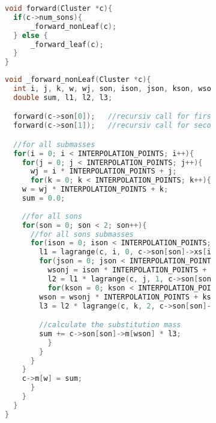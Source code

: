 \begin{figure}[t]
  \begin{subfigure}{0.9\textwidth}
    \begin{lstlisting}[language=C, label=lst:forw, caption={Diese Methode dient dem rekursiven Aufruf der Vorwärtstransformation und delegiert die Konstruktion der Ersatzmassen.
							    Dabei wird zwischen Blatt-und Nicht-Blattclustern unterschieden.}]
void forward(Cluster *c){
  if(c->num_sons){
      _forward_nonLeaf(c);
  } else {
      _forward_leaf(c);
  }
}
    \end{lstlisting}
  \end{subfigure}
\end{figure}

\begin{figure}[p]
  \begin{subfigure}{0.9\textwidth}
    \begin{lstlisting}[language=C, label=lst:forwnonleaf, caption={Diese Methode arbeitet auf den Transfermatrizen und ruft daher zuert rekursiv die Vorwärtstransformation für die Sohncluster auf.}]
void _forward_nonLeaf(Cluster *c){
  int i, j, k, w, wj, son, ison, json, kson, wson, wsonj;
  double sum, l1, l2, l3;

  forward(c->son[0]);	//recursiv call for first son
  forward(c->son[1]);	//recursiv call for second son

  //for all submasses
  for(i = 0; i < INTERPOLATION_POINTS; i++){
    for(j = 0; j < INTERPOLATION_POINTS; j++){
      wj = i * INTERPOLATION_POINTS + j;
      for(k = 0; k < INTERPOLATION_POINTS; k++){
	w = wj * INTERPOLATION_POINTS + k;
	sum = 0.0;
	
	//for all sons
	for(son = 0; son < 2; son++){
	  //for all sons submasses
	  for(ison = 0; ison < INTERPOLATION_POINTS; ison++){
	    l1 = lagrange(c, i, 0, c->son[son]->xs[ison]);
	    for(json = 0; json < INTERPOLATION_POINTS; json++){
	      wsonj = ison * INTERPOLATION_POINTS + json;
	      l2 = l1 * lagrange(c, j, 1, c->son[son]->xs[INTERPOLATION_POINTS + json]);
	      for(kson = 0; kson < INTERPOLATION_POINTS; kson++){
		wson = wsonj * INTERPOLATION_POINTS + kson;
		l3 = l2 * lagrange(c, k, 2, c->son[son]->xs[2 * INTERPOLATION_POINTS + kson]);

		//calculate the substitution mass
		sum += c->son[son]->m[wson] * l3;
	      }
	    }
	  }
	}
	c->m[w] = sum;
      }
    }
  }
}     
    \end{lstlisting}
  \end{subfigure}
\end{figure}

